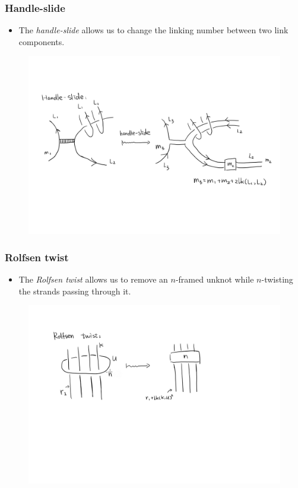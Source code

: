 \documentclass{beamer}
\theoremstyle{ex}
\theoremstyle{rem}
\begin{document}
	\begin{frame}
		\frametitle{Handle-slide}
		\begin{itemize}
			\item The \textit{handle-slide} allows us to change the linking number between two link components.
		\end{itemize}
		\pause
		\begin{figure}
			\includegraphics[scale=0.09]{handleslide}
		\end{figure}
	\end{frame}
	
	\begin{frame}
		\frametitle{Rolfsen twist}
		\begin{itemize}
			\item The \textit{Rolfsen twist} allows us to remove an $n$-framed unknot while $n$-twisting the strands passing through it.
		\end{itemize}
		\pause
		\begin{figure}
			\includegraphics[width=\textwidth]{rolfsentwist}
		\end{figure}
	\end{frame}
	
\end{document}
